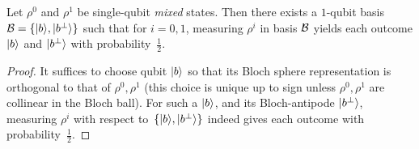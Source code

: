%
%


\begin{lemma}\label{lem:perpy}
    Let $\rho^0$ and $\rho^1$ be single-qubit \emph{mixed} states. Then there exists a $1$-qubit basis $\mathcal{B} = \{\lvert b\rangle, \lvert\smash{b^\bot}\rangle\}$ such that for $i = 0, 1$, measuring $\rho^i$ in basis $\mathcal{B}$ yields each outcome $\lvert b\rangle$ and $\lvert\smash{b^\bot}\rangle$ with probability~$\frac12$.
\end{lemma}
\begin{proof}
     It suffices to choose qubit $\lvert b\rangle$ so that its Bloch sphere representation is orthogonal to that of $\rho^0, \rho^1$ (this choice is unique up to sign unless $\rho^0, \rho^1$ are collinear in the Bloch ball).  For such a $\lvert b\rangle$, and its Bloch-antipode $\lvert\smash{b^\bot}\rangle$, 
     measuring $\rho^i$ with respect to~$\{\lvert b\rangle, \lvert\smash{b^\bot}\rangle\}$ indeed gives each outcome with probability~$\frac12$.
\end{proof}

